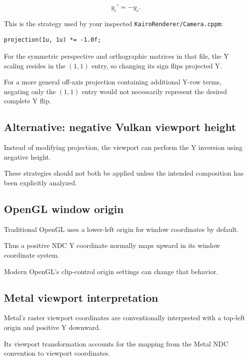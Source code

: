 \[
 \boxed{ y_c'=-y_c }.
\]

This is the strategy used by your inspected \texttt{KairoRenderer/Camera.cppm}:

\begin{verbatim}
projection(1u, 1u) *= -1.0f;
\end{verbatim}

For the symmetric perspective and orthographic matrices in that file, the Y scaling resides in the \((1,1)\) entry, so changing its sign flips projected Y.

For a more general off-axis projection containing additional Y-row terms, negating only the \((1,1)\) entry would not necessarily represent the desired complete Y flip.

\subsection{Alternative: negative Vulkan viewport height}\label{02-foundations-ii-ch033-alternative-negative-vulkan-viewport-height}

Instead of modifying projection, the viewport can perform the Y inversion using negative height.

These strategies should not both be applied unless the intended composition has been explicitly analyzed.

\subsection{OpenGL window origin}\label{02-foundations-ii-ch033-opengl-window-origin}

Traditional OpenGL uses a lower-left origin for window coordinates by default.

Thus a positive NDC Y coordinate normally maps upward in its window coordinate system.

Modern OpenGL's clip-control origin settings can change that behavior.

\subsection{Metal viewport interpretation}\label{02-foundations-ii-ch033-metal-viewport-interpretation}

Metal's raster viewport coordinates are conventionally interpreted with a top-left origin and positive Y downward.

Its viewport transformation accounts for the mapping from the Metal NDC convention to viewport coordinates.

